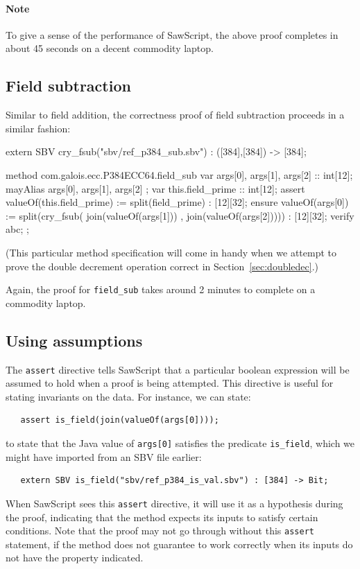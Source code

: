 \documentclass[12pt]{galois-whitepaper}
\newcommand{\sawScript}{{\sc SawScript}\xspace}
\begin{document}
\paragraph{Note} To give a sense of the performance of \sawScript, the above proof completes in about 45 seconds on a decent commodity laptop.

\subsection{Field subtraction}
Similar to field addition, the correctness proof of field subtraction proceeds in a similar fashion:

\begin{code}
  extern SBV cry_fsub("sbv/ref_p384_sub.sbv") : ([384],[384]) -> [384];

  method com.galois.ecc.P384ECC64.field_sub {
    var args[0], args[1], args[2] :: int[12];
    mayAlias { args[0], args[1], args[2] };
    var this.field_prime :: int[12];
    assert valueOf(this.field_prime) := split(field_prime) : [12][32];
    ensure valueOf(args[0]) :=
         split(cry_fsub( join(valueOf(args[1]))
                       , join(valueOf(args[2])))) : [12][32];
    verify abc;
  };
\end{code}

(This particular method specification will come in handy when we attempt to prove the double decrement operation correct in Section~\ref{sec:doubledec}.)

Again, the proof for {\tt field\_sub} takes around 2 minutes to complete on a commodity laptop.

\subsection{Using assumptions}

The {\tt assert} directive tells \sawScript that a particular boolean expression will be assumed to hold when a proof is being attempted. This directive is
useful for stating invariants on the data. For instance, we can state:
\begin{Verbatim}
   assert is_field(join(valueOf(args[0]))); 
\end{Verbatim}
to state that the Java value of {\tt args[0]} satisfies the predicate {\tt is\_field}, which we might have
imported from an SBV file earlier:
\begin{Verbatim}
   extern SBV is_field("sbv/ref_p384_is_val.sbv") : [384] -> Bit;
\end{Verbatim}
When \sawScript sees this {\tt assert} directive, it will use it as a hypothesis during the proof, indicating that the method expects its inputs to
satisfy certain conditions. Note that the proof may not go through without this {\tt assert} statement, if the method does not guarantee to work
correctly when its inputs do not have the property indicated.
\end{document}
